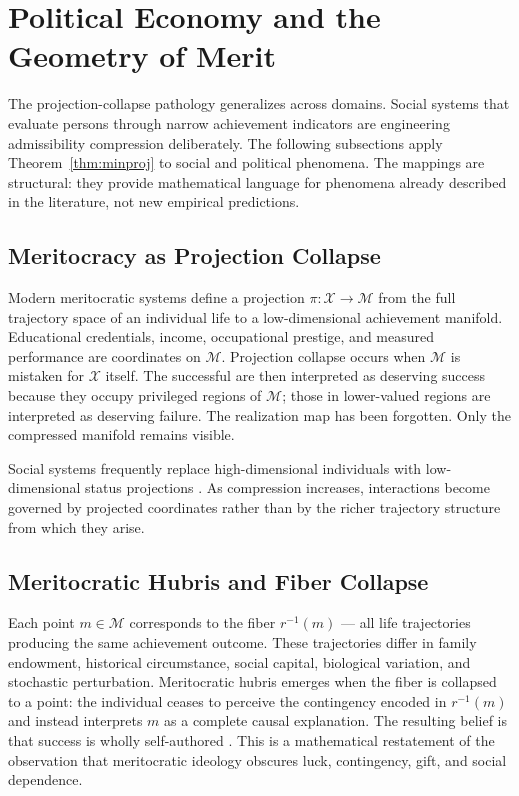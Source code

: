 \documentclass[12pt, a4paper]{article}
\theoremstyle{rsvpstyle}
\theoremstyle{definition}
\newcommand{\Traj}{\mathcal{X}}
\newcommand{\OpMan}{\mathcal{M}}
\begin{document}
\section{Political Economy and the Geometry of Merit}

The projection-collapse pathology generalizes across domains. Social systems
that evaluate persons through narrow achievement indicators are engineering
admissibility compression deliberately. The following subsections apply
Theorem~\ref{thm:minproj} to social and political phenomena. The mappings
are structural: they provide mathematical language for phenomena already
described in the literature, not new empirical predictions.

\subsection{Meritocracy as Projection Collapse}

Modern meritocratic systems define a projection
$\pi : \Traj \to \OpMan$
from the full trajectory space of an individual life to a low-dimensional
achievement manifold. Educational credentials, income, occupational prestige,
and measured performance are coordinates on $\OpMan$. Projection collapse
occurs when $\OpMan$ is mistaken for $\Traj$ itself. The successful are then
interpreted as deserving success because they occupy privileged regions of
$\OpMan$; those in lower-valued regions are interpreted as deserving failure.
The realization map has been forgotten. Only the compressed manifold remains
visible.

Social systems frequently replace high-dimensional individuals with
low-dimensional status projections \citep{Sandel2020}. As compression
increases, interactions become governed by projected coordinates rather than
by the richer trajectory structure from which they arise.

\subsection{Meritocratic Hubris and Fiber Collapse}

Each point $m \in \OpMan$ corresponds to the fiber $r^{-1}(m)$ --- all life
trajectories producing the same achievement outcome. These trajectories differ
in family endowment, historical circumstance, social capital, biological
variation, and stochastic perturbation. Meritocratic hubris emerges when the
fiber is collapsed to a point: the individual ceases to perceive the contingency
encoded in $r^{-1}(m)$ and instead interprets $m$ as a complete causal
explanation. The resulting belief is that success is wholly self-authored
\citep{Sandel2020}. This is a mathematical restatement of the observation that
meritocratic ideology obscures luck, contingency, gift, and social dependence.
\end{document}
